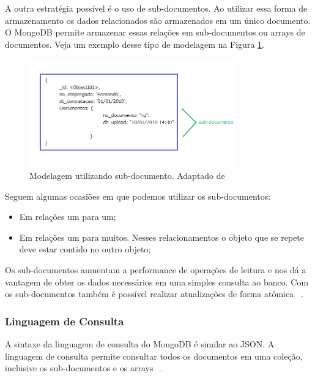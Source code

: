 A outra estratégia possível é o uso de sub-documentos. Ao utilizar essa forma de armazenamento os dados relacionados são armazenados em um único documento. O MongoDB permite armazenar essas relações em sub-documentos ou arrays de documentos. Veja um exemplo desse tipo de modelagem na Figura \ref{fig:subdocumento}.

	\begin{figure}[!htbp]
		\begin{center}
			\includegraphics[width=0.8\textwidth]{subdocumento}
		\end{center}
		\caption{ Modelagem utilizando sub-documento. Adaptado de ~\cite{sitemongodb}}
		\label{fig:subdocumento}
	\end{figure}

Seguem algumas ocasiões em que podemos utilizar os sub-documentos:

\begin{itemize}
	\item Em relações um para um;
	\item Em relações um para muitos. Nesses relacionamentos o objeto que se repete deve estar contido no outro objeto;
\end{itemize}

Os sub-documentos aumentam a performance de operações de leitura e nos dá a vantagem de obter os dados necessários em uma simples consulta ao banco. Com os sub-documentos também é possível realizar atualizações de forma atômica ~\cite{Orendanalysisand}.

\subsubsection{Linguagem de Consulta}

A sintaxe da linguagem de consulta do MongoDB é similar ao JSON. A linguagem de consulta permite consultar todos os documentos em uma coleção, inclusive os sub-documentos e os arrays ~\cite{Orendanalysisand}.

